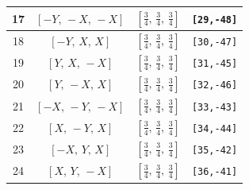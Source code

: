 \documentclass[fleqn,8pt]{jsarticle}
\begin{document}
\begin{longtable}{cccc}
17 & $\left[ - Y,\, - X,\, - X \right]$ & $\left[ \frac{3}{4},\, \frac{3}{4},\, \frac{3}{4} \right]$ & {\tt [29,-48]} \\ \hline
18 & $\left[ - Y,\, X,\, X \right]$ & $\left[ \frac{3}{4},\, \frac{3}{4},\, \frac{3}{4} \right]$ & {\tt [30,-47]} \\ \hline
19 & $\left[ Y,\, X,\, - X \right]$ & $\left[ \frac{3}{4},\, \frac{3}{4},\, \frac{3}{4} \right]$ & {\tt [31,-45]} \\ \hline
20 & $\left[ Y,\, - X,\, X \right]$ & $\left[ \frac{3}{4},\, \frac{3}{4},\, \frac{3}{4} \right]$ & {\tt [32,-46]} \\ \hline
21 & $\left[ - X,\, - Y,\, - X \right]$ & $\left[ \frac{3}{4},\, \frac{3}{4},\, \frac{3}{4} \right]$ & {\tt [33,-43]} \\ \hline
22 & $\left[ X,\, - Y,\, X \right]$ & $\left[ \frac{3}{4},\, \frac{3}{4},\, \frac{3}{4} \right]$ & {\tt [34,-44]} \\ \hline
23 & $\left[ - X,\, Y,\, X \right]$ & $\left[ \frac{3}{4},\, \frac{3}{4},\, \frac{3}{4} \right]$ & {\tt [35,-42]} \\ \hline
24 & $\left[ X,\, Y,\, - X \right]$ & $\left[ \frac{3}{4},\, \frac{3}{4},\, \frac{3}{4} \right]$ & {\tt [36,-41]} \\
\end{longtable}
\renewcommand{\arraystretch}{1.2}
\end{document}
